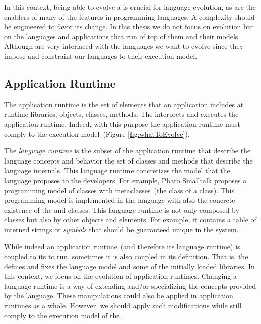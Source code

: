 In this context, being able to evolve a \VM is crucial for language evolution, as \VMs are the enablers of many of the features in programming languages. A \VM complexity should be engineered to favor its change. In this thesis we do not focus on \VM evolution but on the languages and applications that run of top of them and their models. Although \VMs are very interlaced with the languages we want to evolve since they impose and constraint our languages to their execution model.

\subsection{Application Runtime}

The application runtime is the set of elements that an application includes at runtime \eg libraries, objects, classes, methods. The \VM interprets and executes the application runtime. Indeed, with this purpose the application runtime must comply to the \VM execution model~(Figure \ref{fig:whatToEvolve}).

The \emph{language runtime} is the subset of the application runtime that describe the language concepts and behavior \ie the set of classes and methods that describe the language internals. This language runtime concretizes the model that the language proposes to the developers. For example, Pharo Smalltalk proposes a programming model of classes with metaclasses~(the class of a class). This programming model is implemented in the language with also the concrete existence of the  and  classes. This language runtime is not only composed by classes but also by other objects and elements. For example, it contains a table of interned strings or \emph{symbols} that should be guaranteed unique in the system.

While indeed an application runtime~(and therefore its language runtime) is coupled to its \VM to run, sometimes it is also coupled in its definition. That is, the \VM defines and fixes the language model and some of the initially loaded libraries. In this context, we focus on the evolution of application runtimes. Changing a language runtime is a way of extending and/or specializing the concepts provided by the language. These manipulations could also be applied in application runtimes as a whole. However, we should apply such modifications while still comply to the execution model of the \VM.



